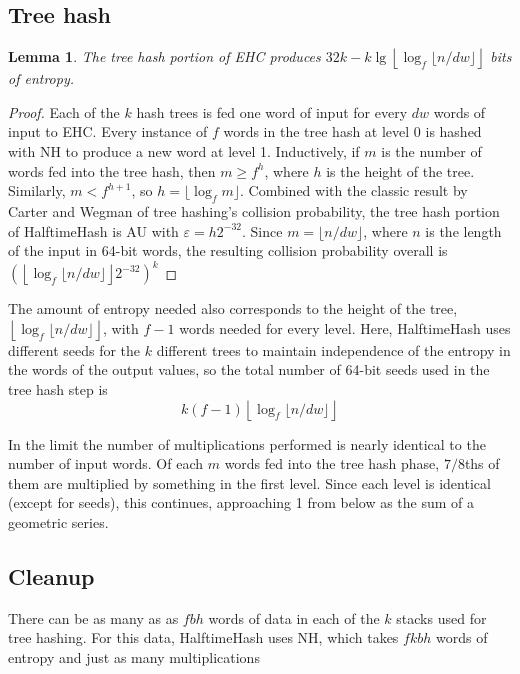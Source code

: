 \documentclass[acmsmall, nonacm]{acmart}
\newtheorem*{lemma}{Lemma}
\begin{document}

\subsection{Tree hash}

\begin{lemma}
The tree hash portion of EHC produces $32k - k\lg\left\lfloor\log_f \lfloor n/dw\rfloor\right\rfloor$ bits of entropy.
\end{lemma}
\begin{proof}
Each of the $k$ hash trees is fed one word of input for every $dw$ words of input to EHC.
Every instance of $f$ words in the tree hash at level 0 is hashed with NH to produce a new word at level 1.
Inductively, if $m$ is the number of words fed into the tree hash, then $m \geq f^h$, where $h$ is the height of the tree.
Similarly, $m < f^{h+1}$, so $h = \lfloor \log_f m \rfloor$.
Combined with the classic result by Carter and Wegman of tree hashing's collision probability, the tree hash portion of HalftimeHash is AU with $\varepsilon = h 2^{-32}$.
Since $m = \lfloor n / d w \rfloor$, where $n$ is the length of the input in 64-bit words, the resulting collision probability overall is $\left(\left\lfloor \log_f \lfloor n / d w \rfloor \right\rfloor 2^{-32}\right)^k$
\end{proof}

The amount of entropy needed also corresponds to the height of the tree, $\left\lfloor\log_f \lfloor n/dw\rfloor\right\rfloor$, with $f - 1$ words needed for every level.
Here, HalftimeHash uses different seeds for the $k$ different trees to maintain independence of the entropy in the words of the output values, so the total number of 64-bit seeds used in the tree hash step is \[k(f-1)\left\lfloor\log_f \lfloor n/dw\rfloor\right\rfloor\]

In the limit the number of multiplications performed is nearly identical to the number of input words.
Of each $m$ words fed into the tree hash phase, $7/8$ths of them are multiplied by something in the first level.
Since each level is identical (except for seeds), this continues, approaching 1 from below as the sum of a geometric series.

\subsection{Cleanup}

There can be as many as as $f b h$ words of data in each of the $k$ stacks used for tree hashing.
For this data, HalftimeHash uses NH, which takes $f k b h$ words of entropy and just as many multiplications
\end{document}
